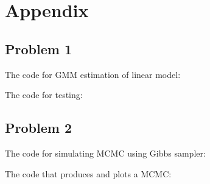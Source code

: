 \documentclass{article}
\begin{document}
\pagebreak

\section{Appendix}

\subsection{Problem 1}

The code for GMM estimation of linear model:



The code for testing:



\subsection{Problem 2}

The code for simulating MCMC using Gibbs sampler:



The code that produces and plots a MCMC:


\end{document}
